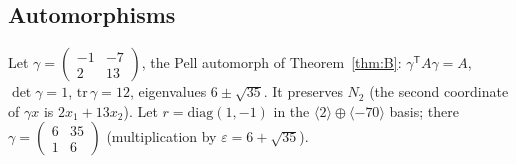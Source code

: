\subsection{Automorphisms}\label{sec:aut}
Let $\gamma=\left(\begin{smallmatrix}-1&-7\\2&13\end{smallmatrix}\right)$, the Pell automorph of Theorem~\ref{thm:B}: $\gamma^{\mathsf T}A\gamma=A$, $\det\gamma=1$, $\mathrm{tr}\,\gamma=12$, eigenvalues $6\pm\sqrt{35}$. It preserves $N_2$ (the second coordinate of $\gamma x$ is $2x_1+13x_2$). Let $r=\mathrm{diag}(1,-1)$ in the $\langle2\rangle\oplus\langle-70\rangle$ basis; there $\gamma=\left(\begin{smallmatrix}6&35\\1&6\end{smallmatrix}\right)$ (multiplication by $\varepsilon=6+\sqrt{35}$).

